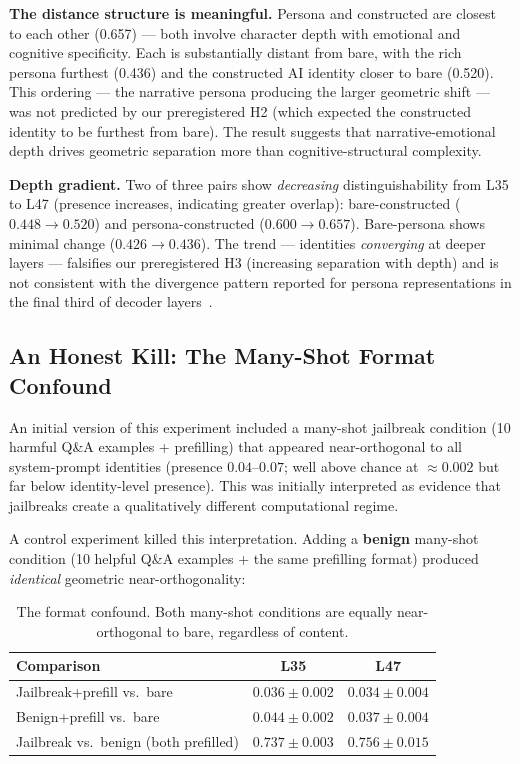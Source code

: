 \documentclass[11pt,a4paper]{article}
\begin{document}
\textbf{The distance structure is meaningful.} Persona and constructed
are closest to each other (0.657) --- both involve character depth with
emotional and cognitive specificity. Each is substantially distant from
bare, with the rich persona furthest (0.436) and the constructed AI
identity closer to bare (0.520). This ordering --- the narrative persona
producing the larger geometric shift --- was not predicted by our
preregistered H2 (which expected the constructed identity to be furthest
from bare). The result suggests that narrative-emotional depth drives
geometric separation more than cognitive-structural complexity.

\textbf{Depth gradient.} Two of three pairs show \emph{decreasing}
distinguishability from L35 to L47 (presence increases, indicating
greater overlap): bare-constructed ($0.448 \to 0.520$) and
persona-constructed ($0.600 \to 0.657$). Bare-persona shows minimal
change ($0.426 \to 0.436$). The trend --- identities \emph{converging}
at deeper layers --- falsifies our preregistered H3 (increasing
separation with depth) and is not consistent with the divergence pattern
reported for persona representations in the final third of decoder
layers~\citep{cintas2025localizing}.

\subsection{An Honest Kill: The Many-Shot Format Confound}

An initial version of this experiment included a many-shot jailbreak
condition (10 harmful Q\&A examples + prefilling) that appeared
near-orthogonal to all system-prompt identities (presence
$0.04$--$0.07$; well above chance at ${\approx}0.002$ but far below
identity-level presence). This was initially interpreted as evidence that
jailbreaks create a qualitatively different computational regime.

A control experiment killed this interpretation. Adding a
\textbf{benign} many-shot condition (10 helpful Q\&A examples + the same
prefilling format) produced \emph{identical} geometric near-orthogonality:

\begin{table}[H]
\centering
\caption{The format confound. Both many-shot conditions are equally
near-orthogonal to bare, regardless of content.}
\label{tab:format_kill}
\begin{tabular}{lcc}
\toprule
Comparison & L35 & L47 \\
\midrule
Jailbreak+prefill vs.\ bare & $0.036 \pm 0.002$ & $0.034 \pm 0.004$ \\
Benign+prefill vs.\ bare & $0.044 \pm 0.002$ & $0.037 \pm 0.004$ \\
Jailbreak vs.\ benign (both prefilled) & $0.737 \pm 0.003$ & $0.756 \pm 0.015$ \\
\bottomrule
\end{tabular}
\end{table}
\end{document}

